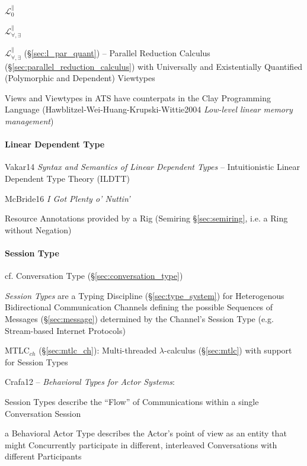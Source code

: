 $\mathcal{L}^\parallel_0$

$\mathcal{L}^\parallel_{\forall, \exists}$

\fist $\mathcal{L}^\parallel_{\forall,\exists}$
(\S\ref{sec:l_par_quant}) -- Parallel Reduction Calculus
(\S\ref{sec:parallel_reduction_calculus}) with Universally and
Existentially Quantified (Polymorphic and Dependent) Viewtypes

Views and Viewtypes in ATS have counterpats in the Clay Programming
Language (Hawblitzel-Wei-Huang-Krupski-Wittie2004 \emph{Low-level
  linear memory management})



\paragraph{Linear Dependent Type}\label{sec:dependent_linear}\hfill

Vakar14 \emph{Syntax and Semantics of Linear Dependent Types} --
Intuitionistic Linear Dependent Type Theory (ILDTT)

McBride16 \emph{I Got Plenty o' Nuttin'}

Resource Annotations provided by a Rig (Semiring \S\ref{sec:semiring},
i.e. a Ring without Negation)



\paragraph{Session Type}\label{sec:session_type}\hfill

\fist cf. Conversation Type (\S\ref{sec:conversation_type})

\emph{Session Types} are a Typing Discipline (\S\ref{sec:type_system})
for Heterogenous Bidirectional Communication Channels defining the
possible Sequences of Messages (\S\ref{sec:message}) determined by the
Channel's Session Type (e.g. Stream-based Internet Protocols)
\cite{neubauer-thiemann04}

\fist MTLC$_{ch}$ (\S\ref{sec:mtlc_ch}): Multi-threaded
$\lambda$-calculus (\S\ref{sec:mtlc}) with support for Session Types

Crafa12 -- \emph{Behavioral Types for Actor Systems}:

Session Types describe the ``Flow'' of Communications within a single
Conversation Session

a Behavioral Actor Type describes the Actor's point of view as an
entity that might Concurrently participate in different, interleaved
Conversations with different Participants

